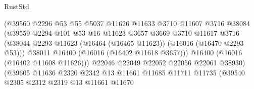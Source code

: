 \begin{lexlean}{RustStd}
\begin{coremodule}
                                      (@39560
                                        @2296
                                        @53
                                        @55
                                        @5037
                                        @11626
                                        @11633
                                        @3710
                                        @11607
                                        @3716
                                        @38084
                                        (@39559
                                          @2294
                                          @101
                                          @53
                                          @16
                                          @11623
                                          @3657
                                          @3669
                                          @3710
                                          @11617
                                          @3716
                                          (@38044
                                            @2293
                                            @11623
                                            (@16464 (@16465 @11623))
                                            (@16016 (@16470 @2293 @53)))
                                          @38011
                                          @16400
                                          (@16016 (@16402 @11618 @3657)))
                                        @16400
                                        (@16016 (@16402 @11608 @11626)))
                                      @22046
                                      @22049
                                      @22052
                                      @22056
                                      @22061
                                      @38930)
                                    (@39605
                                      @11636
                                      @2320
                                      @2342
                                      @13
                                      @11661
                                      @11685
                                      @11711
                                      @11735
                                      (@39540
                                        @2305
                                        @2312
                                        @2319
                                        @13
                                        @11661
                                        @11670

\end{coremodule}
\end{lexlean}
